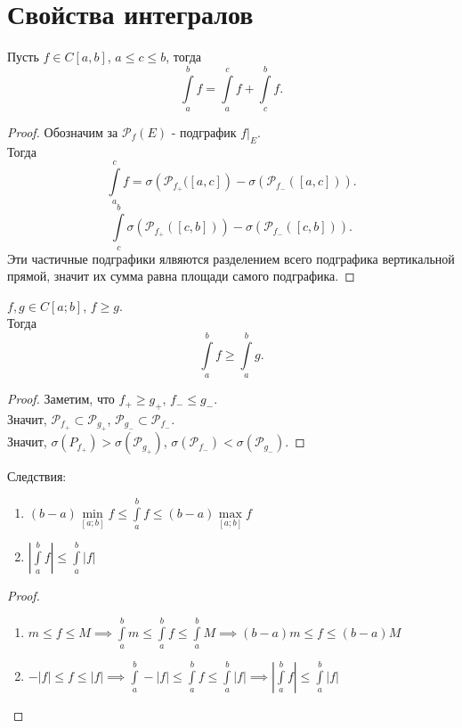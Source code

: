 \documentclass[11pt, oneside]{article}   	%
\begin{document}
    \section{Свойства интегралов}
    \begin{theorem} Пусть $f\in C\left[a, b\right]$, $a \le c \le b$, тогда
            \[ \int\limits_{a}^{b} f = \int\limits_{a}^{c} f + \int\limits_{c}^{b} f    .\]
            \begin{proof}
                Обозначим за $\mathcal{P}_{f}(E)$ - подграфик $\left. f\right|_{E}$.\\
                Тогда 
                \[ \int\limits_{a}^{c} f = \sigma\left( \mathcal{P}_{f_{+}}([a, c] \right) - \sigma(\mathcal{P}_{f_{-}}([a, c]))   .\]
                \[ \int\limits_{c}^{b} \sigma(\mathcal{P}_{f_{+}}([c, b])) - \sigma(\mathcal{P}_{f_{-}}([c, b]))  .\]
                Эти частичные подграфики ялвяются разделением всего подграфика вертикальной прямой, значит их сумма равна площади самого подграфика.
            \end{proof}
       \end{theorem}
       \begin{theorem}
            $f, g\in C\left[a; b\right]$, $f \ge g$.\\
            Тогда
            \[ \int\limits_{a}^{b} f \ge \int\limits_{a}^{b} g   .\]
            \begin{proof}
                Заметим, что $f_{+} \ge g_{+}$, $f_{-} \le g_{-}$.\\
                Значит, $\mathcal{P}_{f_+} \subset \mathcal{P}_{g_+}$, $\mathcal{P}_{g_-} \subset \mathcal{P}_{f_{-}}$.\\
                Значит, $\sigma(P_{f_+}) > \sigma(\mathcal{P}_{g_+})$, $\sigma(\mathcal{P}_{f_-}) < \sigma(\mathcal{P}_{g_{-}})$.
            \end{proof}
       \end{theorem}
       \begin{tlemma} Следствия:
           \begin{enumerate}
               \item $(b-a)\min\limits_{\left[a; b\right]} f \le \int\limits_{a}^{b} f \le (b-a)\max\limits_{\left[a; b\right]} f$
               \item $\left|\int\limits_{a}^{b} f\right| \le \int\limits_{a}^{b} |f|  $
           \end{enumerate}
           \begin{proof}
               \begin{enumerate}
                   \item $m \le f \le M \implies \int\limits_{a}^{b} m \le \int\limits_{a}^{b} f \le \int\limits_{a}^{b} M \implies (b-a)m \le f \le (b-a)M    $
                   \item $-|f| \le f \le |f| \implies \int\limits_{a}^{b} -|f| \le \int\limits_{a}^{b} f \le \int\limits_{a}^{b} |f| \implies \left| \int\limits_{a}^{b} f\right| \le \int\limits_{a}^{b} |f|      $
               \end{enumerate}
           \end{proof}
       \end{tlemma}
\end{document}
